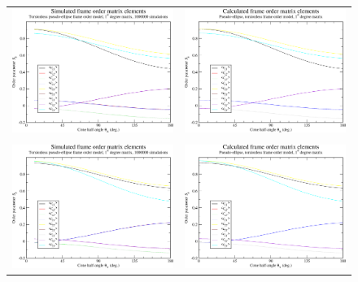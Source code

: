 \begin{figure}
\centering
  \begin{tabular}{@{}cc@{}}
    \includegraphics[width=.5\textwidth]{images/frame_order_matrix/Sij_pseudo-ellipse_torsionless_out_of_frame_theta_x_ens1000000.eps} &
    \includegraphics[width=.5\textwidth]{images/frame_order_matrix/Sij_pseudo-ellipse_torsionless_out_of_frame_theta_x_calc.eps} \\
    \\[-5pt]
    \includegraphics[width=.5\textwidth]{images/frame_order_matrix/Sij_pseudo-ellipse_torsionless_out_of_frame_theta_y_ens1000000.eps} &
    \includegraphics[width=.5\textwidth]{images/frame_order_matrix/Sij_pseudo-ellipse_torsionless_out_of_frame_theta_y_calc.eps} \\

\end{tabular}
\end{figure}
